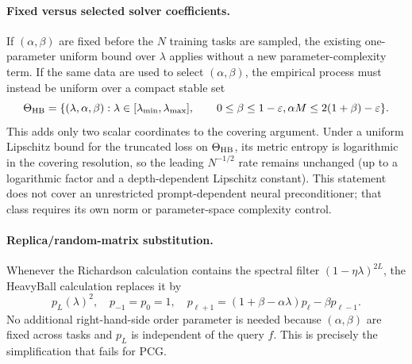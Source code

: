\paragraph{Fixed versus selected solver coefficients.}
If $(\alpha,\beta)$ are fixed before the $N$ training tasks are sampled, the
existing one-parameter uniform bound over $\lambda$ applies without a new
parameter-complexity term.  If the same data are used to select
$(\alpha,\beta)$, the empirical process must instead be uniform over a compact
stable set
\[
 \Theta_{\rm HB}
 =\{(\lambda,\alpha,\beta):
 \lambda\in[\lambda_{\min},\lambda_{\max}],
 \qquad 0\leq\beta\leq1-\varepsilon,
 \alpha M\leq2(1+\beta)-\varepsilon\}.
\]
This adds only two scalar coordinates to the covering argument.  Under a
uniform Lipschitz bound for the truncated loss on $\Theta_{\rm HB}$, its metric
entropy is logarithmic in the covering resolution, so the leading
$N^{-1/2}$ rate remains unchanged (up to a logarithmic factor and a
depth-dependent Lipschitz constant).  This statement does not cover an
unrestricted prompt-dependent neural preconditioner; that class requires its
own norm or parameter-space complexity control.

\paragraph{Replica/random-matrix substitution.}
Whenever the Richardson calculation contains the spectral filter
$(1-\eta\lambda)^{2L}$, the HeavyBall calculation replaces it by
\begin{equation}
 p_L(\lambda)^2,
 \quad
 p_{-1}=p_0=1,
 \quad
 p_{\ell+1}=(1+\beta-\alpha\lambda)p_\ell-\beta p_{\ell-1}.
 \label{eq:gen-hb-replica-filter}
\end{equation}
No additional right-hand-side order parameter is needed because
$(\alpha,\beta)$ are fixed across tasks and $p_L$ is independent of the query
$f$.  This is precisely the simplification that fails for PCG.
